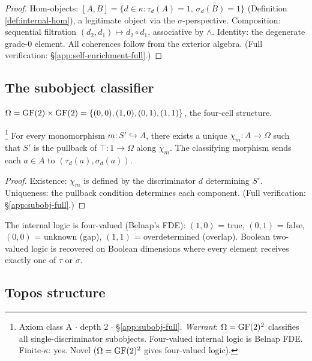 \begin{proof}
Hom-objects: $[A,B] = \{d \in \kappa : \tau_d(A) = 1,\,
\sigma_d(B) = 1\}$ (Definition \ref{def:internal-hom}),
a legitimate object via the $\sigma$-perspective.
Composition: sequential filtration $(d_2, d_1) \mapsto
d_2 \circ d_1$, associative by $\wedge$. Identity: the
degenerate grade-0 element. All coherences follow from
the exterior algebra. (Full verification:
\S\ref{app:self-enrichment-full}.)
\end{proof}

\subsection{The subobject classifier}\label{sec:subobject}

\begin{definition}\label{def:subobj-class}
$\Omega = \operatorname{GF}(2) \times \operatorname{GF}(2) = \{(0,0), (1,0), (0,1),
(1,1)\}$, the four-cell structure.
\end{definition}

\begin{theorem}\footnote{Axiom class \textsf{A} $\cdot$ depth 2 $\cdot$ \S\ref{app:subobj-full}.  \emph{Warrant}: $\Omega = \operatorname{GF}(2)^2$ classifies all single-discriminator subobjects. Four-valued internal logic is Belnap FDE. Finite-$\kappa$: yes. Novel ($\Omega = \operatorname{GF}(2)^2$ gives four-valued logic).}
\label{thm:subobj}
For every monomorphism $m: S' \hookrightarrow A$, there
exists a unique $\chi_m: A \to \Omega$ such that $S'$ is
the pullback of $\top: 1 \to \Omega$ along $\chi_m$.
The classifying morphism sends each $a \in A$ to
$(\tau_d(a), \sigma_d(a))$.
\end{theorem}

\begin{proof}
Existence: $\chi_m$ is defined by the discriminator $d$
determining $S'$. Uniqueness: the pullback condition
determines each component. (Full verification:
\S\ref{app:subobj-full}.)
\end{proof}

The internal logic is four-valued (Belnap's FDE):
$(1,0)$ = true, $(0,1)$ = false, $(0,0)$ = unknown (gap),
$(1,1)$ = overdetermined (overlap). Boolean two-valued
logic is recovered on Boolean dimensions where every
element receives exactly one of $\tau$ or $\sigma$.

\subsection{Topos structure}


